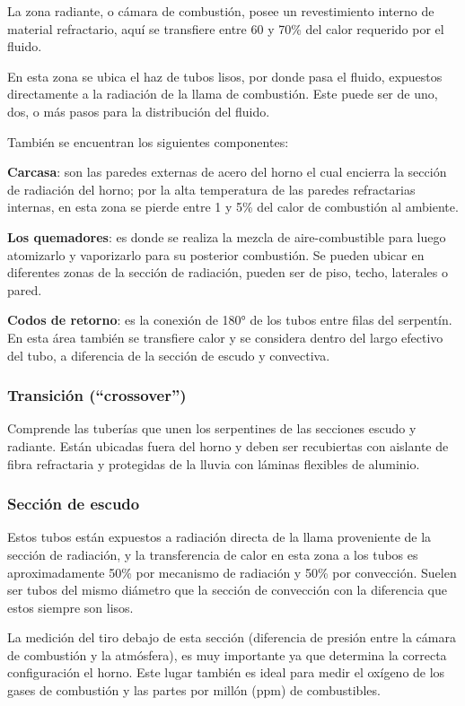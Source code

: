 \par La zona radiante, o cámara de combustión, posee un revestimiento interno de material refractario, aquí se transfiere entre 60 y 70\% del calor requerido por el fluido.
\par En esta zona se ubica el haz de tubos lisos, por donde pasa el fluido, expuestos directamente a la radiación de la llama de combustión. Este puede ser de uno, dos, o más pasos para la distribución del fluido.
\par También se encuentran los siguientes componentes:
\par \textbf{Carcasa}: son las paredes externas de acero del horno el cual encierra la sección de radiación del horno; por la alta temperatura de las paredes refractarias internas, en esta zona se pierde entre 1 y 5\% del calor de combustión al ambiente.
\par \textbf{Los quemadores}: es donde se realiza la mezcla de aire-combustible para luego atomizarlo y vaporizarlo para su posterior combustión. Se pueden ubicar en diferentes zonas de la sección de radiación, pueden ser de piso, techo, laterales o pared.
\par \textbf{Codos de retorno}: es la conexión de 180° de los tubos entre filas del serpentín. En esta área también se transfiere calor y se considera dentro del largo efectivo del tubo, a diferencia de la sección de escudo y convectiva.

\subsubsection{Transición (``crossover'')}
\par Comprende las tuberías que unen los serpentines de las secciones escudo y radiante. Están ubicadas fuera del horno y deben ser recubiertas con aislante de fibra refractaria y protegidas de la lluvia con láminas flexibles de aluminio.

\subsubsection{Sección de escudo}
\par Estos tubos están expuestos a radiación directa de la llama proveniente de la sección de radiación, y la transferencia de calor en esta zona a los tubos es aproximadamente 50\% por mecanismo de radiación y 50\% por convección. Suelen ser tubos del mismo diámetro que la sección de convección con la diferencia que estos siempre son lisos.
\par La medición del tiro debajo de esta sección (diferencia de presión entre la cámara de combustión y la atmósfera), es muy importante ya que determina la correcta configuración el horno. Este lugar también es ideal para medir el oxígeno de los gases de combustión y las partes por millón (ppm) de combustibles.

